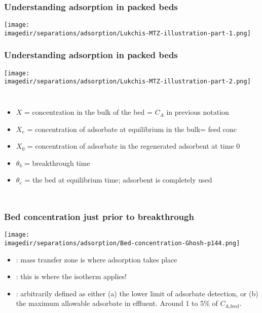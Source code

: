 \begin{frame}\frametitle{Understanding adsorption in packed beds}
	\begin{center}
		\texttt{[image: \\imagedir/separations/adsorption/Lukchis-MTZ-illustration-part-1.png]}
	\end{center}
\end{frame}

\begin{frame}\frametitle{Understanding adsorption in packed beds}
	\begin{center}
		\texttt{[image: \\imagedir/separations/adsorption/Lukchis-MTZ-illustration-part-2.png]}
	\end{center}
	\vspace{-12pt}
	\vspace{-6pt}
	\begin{columns}[t]
			\begin{itemize}
				\item	{\small $X$ = concentration in the bulk of the bed = $C_A$ in previous notation}
				\item	{\small $X_e$ = concentration of adsorbate at equilibrium in the bulk= feed conc}
				\item	{\small $X_0$ = concentration of adsorbate in the regenerated adsorbent at time 0}
				\item	{\small $\theta_b$ = breakthrough time}
				\item	{\small $\theta_e$ = the bed at equilibrium time; adsorbent is completely used}
			\end{itemize}
	\end{columns}	
\end{frame}

\begin{frame}\frametitle{Bed concentration just prior to breakthrough}
	\begin{center}
		\texttt{[image: \\imagedir/separations/adsorption/Bed-concentration-Ghosh-p144.png]}
	\end{center}
	\vspace{-12pt}
	\vspace{6pt}
	\begin{itemize}
		\item	{\color{purple}{MTZ}}: mass transfer zone is where adsorption takes place
		\item	{\color{purple}{Equilibrium zone}}: this is where the isotherm applies!
		\item	{\color{purple}{Breakthrough}}: arbitrarily defined as either (a)  the lower limit of adsorbate detection, or (b) the maximum allowable adsorbate in effluent. Around 1 to 5\% of $C_\text{A,feed}$.
	\end{itemize}
	
\end{frame}

